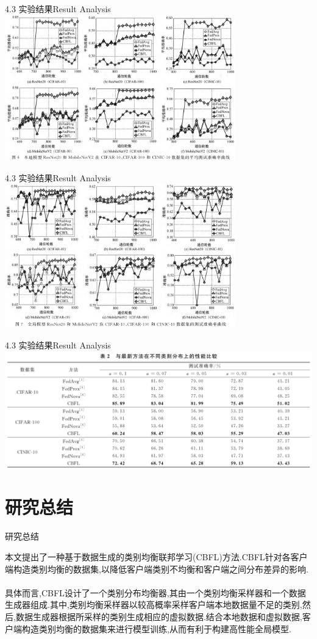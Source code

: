\documentclass{sintefbeamer}
\theoremstyle{definition}
\begin{document}
\begin{frame}{4.3 实验结果}{Result Analysis}
	\includegraphics[width=0.75\textwidth]{images/img_expr1}
\end{frame}

\begin{frame}{4.3 实验结果}{Result Analysis}
	\includegraphics[width=0.75\textwidth]{images/img_expr3}
\end{frame}


\begin{frame}{4.3 实验结果}{Result Analysis}
	\includegraphics[width=1.\textwidth]{images/img_expr4}
\end{frame}



\section{研究总结}

\begin{frame}{研究总结}

本文提出了一种基于数据生成的类别均衡联邦学习(CBFL)方法.CBFL针对各客户端构造类别均衡的数据集,以降低客户端类别不均衡和客户端之间分布差异的影响.
\\ \hspace*{\fill} \\
具体而言,CBFL设计了一个类别分布均衡器,其由一个类别均衡采样器和一个数据生成器组成.其中,类别均衡采样器以较高概率采样客户端本地数据量不足的类别,然后,数据生成器根据所采样的类别生成相应的虚拟数据.结合本地数据和虚拟数据,客户端构造类别均衡的数据集来进行模型训练,从而有利于构建高性能全局模型.
\end{frame}



\backmatter
\end{document}
